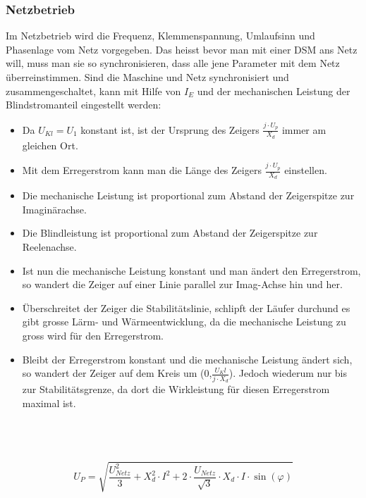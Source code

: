     \subsubsection{Netzbetrieb}
        Im Netzbetrieb wird die Frequenz, Klemmenspannung, Umlaufsinn und Phasenlage vom Netz vorgegeben. Das heisst bevor man mit einer DSM ans Netz will, muss man sie so synchronisieren, dass alle jene Parameter mit dem Netz überreinstimmen. Sind die Maschine und Netz synchronisiert und zusammengeschaltet, kann mit Hilfe von $I_E$ und der mechanischen Leistung der Blindstromanteil eingestellt werden: \\
        \begin{minipage}{8.2cm}
        \end{minipage}
        \begin{minipage}{9.7cm}
            \begin{itemize}
                \item Da $U_{Kl} = U_1$ konstant ist, ist der Ursprung des Zeigers $\frac{j \cdot U_p}{X_d}$ immer am gleichen Ort. 
                \item Mit dem Erregerstrom kann man die Länge des Zeigers $\frac{j \cdot U_p}{X_d}$ einstellen.
                \item Die mechanische Leistung ist proportional zum Abstand der Zeigerspitze zur Imaginärachse.
                \item Die Blindleistung ist proportional zum Abstand  der Zeigerspitze zur Reelenachse.
                \item Ist nun die mechanische Leistung konstant und man ändert den Erregerstrom, so wandert die Zeiger auf einer Linie parallel zur Imag-Achse hin und her.
                \item Überschreitet der Zeiger die Stabilitätslinie, schlipft der Läufer durchund es gibt grosse Lärm- und Wärmeentwicklung, da die mechanische Leistung zu gross wird für den Erregerstrom.
                \item Bleibt der Erregerstrom konstant und die mechanische Leistung ändert sich, so wandert der Zeiger auf dem Kreis um (0,$\frac{U_Kl}{j \cdot X_d}$). Jedoch wiederum nur bis zur Stabilitätsgrenze, da dort die Wirkleistung für diesen Erregerstrom maximal ist.
            \end{itemize}
        \end{minipage}
        \\ \\ \\
        $$ U_P = \sqrt{\frac{U^2_{Netz}}{3} + X_d^2 \cdot I^2 + 2 \cdot \frac{U_{Netz}}{\sqrt{3}}\cdot X_d \cdot I \cdot \sin(\varphi)} $$
        \newpage